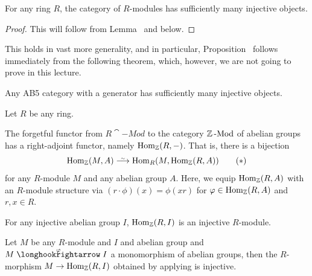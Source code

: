 \documentclass[a4paper,parskip=half,numbers=enddot, DIV=12]{scrreprt}
\begin{document}
\begin{prop}[a.k.a. ``Satz 2'']
	For any ring $R$, the category of $R$-modules has sufficiently many injective objects.
\end{prop}
\begin{proof}
	This will follow from Lemma~ and  below.
\end{proof}
\begin{rem*}
	This holds in vast more generality, and in particular, Proposition~ follows immediately from the following theorem, which, however, we are not going to prove in this lecture.
	\begin{thm*}[Grothendieck]
		Any AB5 category with a generator has sufficiently many injective objects.
	\end{thm*}
\end{rem*}
\begin{lem}
	Let $R$ be any ring.
	\begin{alphanumerate}
		\item The forgetful functor from $R\cat{-Mod}$ to the category $\mathbb{Z}\operatorname{-Mod}$ of abelian groups has a right-adjoint functor, namely $\operatorname{Hom}_{\mathbb{Z}}(R,-)$. That is, there is a bijection
		\begin{align}\lbl{eq:ForgetHomAdjunction}
			\Hom_\IZ(M,A)\isomorphism\Hom_R(M,\Hom_\IZ(R,A))\tag{$*$}
		\end{align}
		for any $R$-module $M$ and any abelian group $A$. Here, we equip $\operatorname{Hom}_{\mathbb{Z}}(R,A)$ with an $R$-module structure via $(r\cdot\phi)(x)=\phi(xr)$ for $\varphi\in\operatorname{Hom}_{\mathbb{Z}}(R,A)$ and $r,x\in R$.
		\item For any injective abelian group $I$, $\operatorname{Hom}_{\mathbb{Z}}(R,I)$ is an injective $R$-module.
		\item Let $M$ be any $R$-module and $I$ and abelian group and $M\monomorphism[\phi]I$ a monomorphism of abelian groups, then the $R$-morphism $M\morphism\Hom_\IZ(R,I)$ obtained by applying  is injective.
	\end{alphanumerate}
\end{lem}
\end{document}

